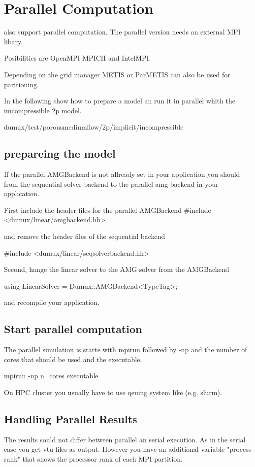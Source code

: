 \section{Parallel Computation}
\label{sec:parallelcomputation}

\Dumux also support parallel computation. The parallel version needs an external MPI libary.

Posibilities are OpenMPI MPICH and IntelMPI.

Depending on the grid manager METIS or ParMETIS can also be used for paritioning.


In the following show  how to prepare a model an run it in parallel whith
the imcompressible 2p model.

dumux/test/porousmediumflow/2p/implicit/incompressible
 

\subsection{prepareing the model}

If the parallel AMGBackend is not allready set in your application
you should from the sequential solver backend to the parallel amg  backend 
in your application.

First include the header files for the parallel AMGBackend
#include <dumux/linear/amgbackend.hh>

and remove the header files of the sequential backend

#include <dumux/linear/seqsolverbackend.hh>


Second, hange the linear solver to the AMG solver 
from the AMGBackend

using LinearSolver = Dumux::AMGBackend<TypeTag>;

and recompile your application.

\subsection{Start parallel computation}
The parallel simulation is starte with mpirun followed by -np and
the number of cores that should be used and the executable. 

mpirun -np n_cores executable

On HPC cluster you usually have to use  qeuing system like (e.g. slurm). 



\subsection{Handling Parallel Results}
The results sould not differ between parallel an serial execution. As in
the serial case you get vtu-files as output. However you have an additional
variable "process rank" that shows the processor rank of each MPI partition.








